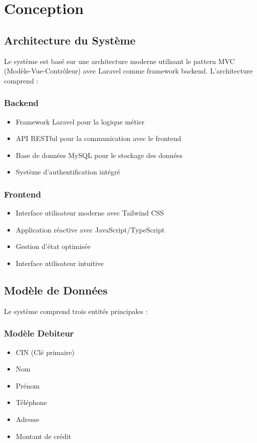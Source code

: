 \documentclass[12pt,a4paper]{report}
\begin{document}
\chapter{Conception}
\section{Architecture du Système}
Le système est basé sur une architecture moderne utilisant le pattern MVC (Modèle-Vue-Contrôleur) avec Laravel comme framework backend. L'architecture comprend :

\subsection{Backend}
\begin{itemize}
    \item Framework Laravel pour la logique métier
    \item API RESTful pour la communication avec le frontend
    \item Base de données MySQL pour le stockage des données
    \item Système d'authentification intégré
\end{itemize}

\subsection{Frontend}
\begin{itemize}
    \item Interface utilisateur moderne avec Tailwind CSS
    \item Application réactive avec JavaScript/TypeScript
    \item Gestion d'état optimisée
    \item Interface utilisateur intuitive
\end{itemize}

\section{Modèle de Données}
Le système comprend trois entités principales :

\subsection{Modèle Debiteur}
\begin{itemize}
    \item CIN (Clé primaire)
    \item Nom
    \item Prénom
    \item Téléphone
    \item Adresse
    \item Montant de crédit
\end{itemize}
\end{document}
